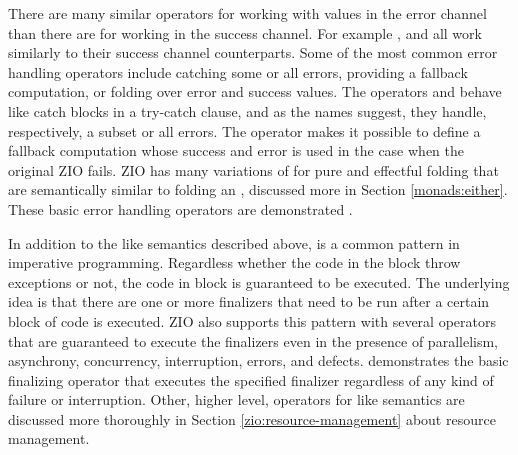 There are many similar operators for working with values in the error channel than there are for working in the success channel. For example ,  and  all work similarly to their success channel counterparts. Some of the most common error handling operators include catching some or all errors, providing a fallback computation, or folding over error and success values. The operators  and  behave like catch blocks in a try-catch clause, and as the names suggest, they handle, respectively, a subset or all errors. The  operator makes it possible to define a fallback computation whose success and error is used in the case when the original ZIO fails. ZIO has many variations of  for pure and effectful folding that are semantically similar to folding an , discussed more in Section \ref{monads:either}. These basic error handling operators are demonstrated .



In addition to the  like semantics described above,  is a common pattern in imperative programming. Regardless whether the code in the  block throw exceptions or not, the code in  block is guaranteed to be executed. The underlying idea is that there are one or more finalizers that need to be run after a certain block of code is executed. ZIO also supports this pattern with several operators that are guaranteed to execute the finalizers even in the presence of parallelism, asynchrony, concurrency, interruption, errors, and defects.  demonstrates the basic finalizing operator  that executes the specified finalizer regardless of any kind of failure or interruption. Other, higher level, operators for  like semantics are discussed more thoroughly in Section \ref{zio:resource-management} about resource management.



